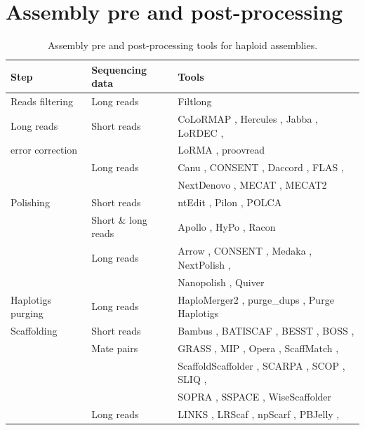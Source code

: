 \section{Assembly pre and post-processing}

\begin{table}
\caption{Assembly pre and post-processing tools for haploid assemblies.}
\begin{tabular}{|l|l|l|}
\hline
\textbf{Step} & \textbf{Sequencing data} &\textbf{Tools} \\
\hline
Reads filtering & Long reads & Filtlong \cite{filtlong} \\
\hline
Long reads & Short reads & CoLoRMAP \cite{colormap}, Hercules \cite{hercules}, Jabba \cite{jabba}, LoRDEC \cite{lordec}, \\
error correction &  & LoRMA \cite{lorma}, proovread \cite{proovread} \\
    \cline{2-3}
    & Long reads & Canu \cite{canu}, CONSENT \cite{consent}, Daccord \cite{daccord}, FLAS \cite{flas}, \\
    &  & NextDenovo \cite{nextdenovo}, MECAT \cite{mecat}, MECAT2 \cite{mecat} \\
\hline
Polishing & Short reads & ntEdit \cite{ntedit}, Pilon \cite{pilon}, POLCA \cite{polca} \\
    \cline{2-3}
    & Short \& long reads & Apollo \cite{apollo}, HyPo \cite{hypo}, Racon \cite{racon} \\
    \cline{2-3}
    & Long reads & Arrow \cite{quiver_arrow}, CONSENT \cite{consent}, Medaka \cite{medaka}, NextPolish \cite{nextpolish}, \\
    &  & Nanopolish \cite{nanopolish}, Quiver \cite{quiver_arrow} \\
\hline
Haplotigs purging & Long reads & HaploMerger2 \cite{haplomerger2}, purge\_dups \cite{purge_dups}, Purge Haplotigs \cite{purge_haplotigs} \\
\hline
Scaffolding & Short reads & Bambus \cite{bambus}, BATISCAF \cite{batiscaf}, BESST \cite{besst}, BOSS \cite{boss}, \\
    & Mate pairs & GRASS \cite{grass}, MIP \cite{mip}, Opera \cite{opera}, ScaffMatch \cite{scaffmatch}, \\
    &  & ScaffoldScaffolder \cite{scaffoldscaffolder}, SCARPA \cite{scarpa}, SCOP \cite{scop}, SLIQ \cite{sliq}, \\
    &  & SOPRA \cite{sopra}, SSPACE \cite{sspace}, WiseScaffolder \cite{wisescaffolder} \\
    \cline{2-3}
    & Long reads & LINKS \cite{links}, LRScaf \cite{lrscaf}, npScarf \cite{npScarf}, PBJelly \cite{pbjelly}, \\

\end{tabular}
\end{table}
